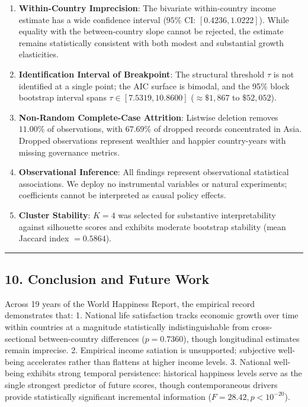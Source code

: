 \documentclass[
]{article}
\providecommand{\tightlist}{%
  \setlength{\itemsep}{0pt}\setlength{\parskip}{0pt}}
\begin{document}
\begin{enumerate}
\def\labelenumi{\arabic{enumi}.}
\tightlist
\item
  \textbf{Within-Country Imprecision}: The bivariate within-country
  income estimate has a wide confidence interval
  (\(95\% \text{ CI: } [0.4236, 1.0222]\)). While equality with the
  between-country slope cannot be rejected, the estimate remains
  statistically consistent with both modest and substantial growth
  elasticities.
\item
  \textbf{Identification Interval of Breakpoint}: The structural
  threshold \(\tau\) is not identified at a single point; the AIC
  surface is bimodal, and the 95\% block bootstrap interval spans
  \(\tau \in [7.5319, 10.8600]\) (\(\approx \$1,867\) to \(\$52,052\)).
\item
  \textbf{Non-Random Complete-Case Attrition}: Listwise deletion removes
  \(11.00\%\) of observations, with \(67.69\%\) of dropped records
  concentrated in Asia. Dropped observations represent wealthier and
  happier country-years with missing governance metrics.
\item
  \textbf{Observational Inference}: All findings represent observational
  statistical associations. We deploy no instrumental variables or
  natural experiments; coefficients cannot be interpreted as causal
  policy effects.
\item
  \textbf{Cluster Stability}: \(K=4\) was selected for substantive
  interpretability against silhouette scores and exhibits moderate
  bootstrap stability (mean Jaccard index \(= 0.5864\)).
\end{enumerate}

\begin{center}\rule{0.5\linewidth}{0.5pt}\end{center}

\hypertarget{conclusion-and-future-work}{%
\subsection{10. Conclusion and Future
Work}\label{conclusion-and-future-work}}

Across 19 years of the World Happiness Report, the empirical record
demonstrates that: 1. National life satisfaction tracks economic growth
over time within countries at a magnitude statistically
indistinguishable from cross-sectional between-country differences
(\(p = 0.7360\)), though longitudinal estimates remain imprecise. 2.
Empirical income satiation is unsupported; subjective well-being
accelerates rather than flattens at higher income levels. 3. National
well-being exhibits strong temporal persistence: historical happiness
levels serve as the single strongest predictor of future scores, though
contemporaneous drivers provide statistically significant incremental
information (\(F = 28.42, p < 10^{-20}\)).
\end{document}
